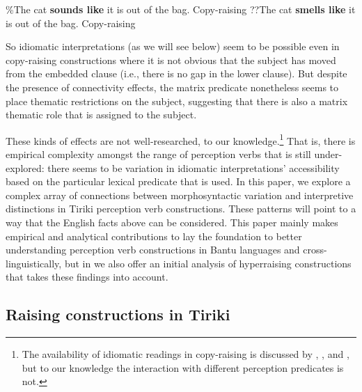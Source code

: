 \documentclass[output=paper,colorlinks,citecolor=brown
]{langscibook}
\begin{document}
\ea \label{ex:johnson:CatIdiomCopyRaising}
\begin{xlist}

\ex \label{ex:johnson:CatIdiomSoundsLike} \%The cat \textbf{sounds like} it is out of the bag. \hfill {Copy-raising}
\ex \label{ex:johnson:CatIdiomSmellsLike} ??The cat \textbf{smells like} it is out of the bag. \hfill {Copy-raising}

\end{xlist}
\z 

\noindent So idiomatic interpretations (as we will see below) seem to be possible even in copy-raising constructions where it is not obvious that the subject has moved from the embedded clause (i.e., there is no gap in the lower clause). But despite the presence of connectivity effects, the matrix predicate nonetheless seems to place thematic restrictions on the subject, suggesting that there is also a matrix thematic role that is assigned to the subject. 

These kinds of effects are not well-researched, to our knowledge.\footnote{The availability of idiomatic readings in copy-raising is discussed by \citet{PotsdamRunner:2001:CopyRaising}, \citet{AsudehToivonen2012CopyRaising}, and \citet{DenDikken:2017:HyperRaising}, but to our knowledge the interaction with different perception predicates is not.} That is, there is empirical complexity amongst the range of perception verbs that is still under-explored: there seems to be variation in idiomatic interpretations' accessibility based on the particular lexical predicate that is used. In this paper, we explore a complex array of connections between morphosyntactic variation and interpretive distinctions in Tiriki perception verb constructions. These patterns will point to a way that the English facts above can be considered. This paper mainly makes empirical and analytical contributions to lay the foundation to better understanding perception verb constructions in Bantu languages and cross-linguistically, but in  we also offer an initial analysis of hyperraising constructions that takes these findings into account. 



\subsection{Raising constructions in Tiriki}
\end{document}
